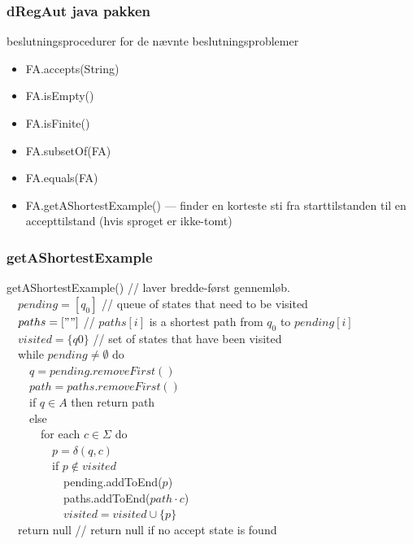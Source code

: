 \begin{frame}
\frametitle{dRegAut java pakken}
beslutningsprocedurer for de 
nævnte beslutningsproblemer
\begin{itemize}
\item  FA.accepts(String) 
\item  FA.isEmpty() 
\item  FA.isFinite() 
\item  FA.subsetOf(FA) 
\item  FA.equals(FA)
  \pause
\item  FA.getAShortestExample() --- finder en korteste sti fra starttilstanden til en  
   accepttilstand (hvis sproget er ikke-tomt)  
\end{itemize}
\end{frame}

\begin{frame}
\frametitle{getAShortestExample}
\small{
getAShortestExample() // laver bredde-først gennemløb.\\
\pause
\ \ $pending = [ q_0 ]$ // queue of states that need to be visited\\
\ \ $paths = [ "" ]$  // $paths[i]$ is a shortest path from $q_0$ to $pending[i]$\\
\ \ $visited = \{ q0 \}$  // set of states that have been visited \\
\pause
\ \ while $pending\neq \emptyset$ do\\
\ \ \ \ $q = pending.removeFirst()$\\
\ \ \ \ $path = paths.removeFirst()$\\  
\ \ \ \ if $q\in A$ then return path\\
\ \ \ \ else\\
\pause
\ \ \ \ \ \ for each $c\in\Sigma$ do \\
\ \ \ \ \ \ \ \ $p = \delta(q, c)$\\
\pause
\ \ \ \ \ \ \ \ if $p\not\in visited$\\
\ \ \ \ \ \ \ \ \ \ pending.addToEnd($p$)\\ 
\ \ \ \ \ \ \ \ \ \ paths.addToEnd($path\cdot c$)\\ 
\ \ \ \ \ \ \ \ \ \ $visited = visited \cup \{p\}$\\
\pause
\ \ return null      // return null if no accept state is found \\
}
\end{frame}

